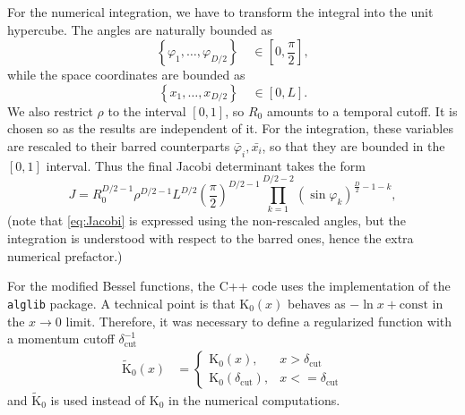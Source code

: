 \documentclass[twocolumn,secnumarabic,amssymb, nobibnotes, aps, prd]{revtex4-2}
\newcommand{\be}{\begin{equation}}
\newcommand{\ee}{\end{equation}}
\begin{document}
For the numerical integration, we have to transform the integral
into the unit hypercube. The angles are naturally bounded as
\be
\left\{ \varphi_{1},\dots,\varphi_{D/2}\right\}  \quad \in\left[0,\frac{\pi}{2}\right],
\ee
while the space coordinates are bounded as
\be
\left\{ x_{1},\dots,x_{D/2}\right\} \quad \in\left[0,L\right].
\ee
We also restrict $\rho$ to the interval $[0,1]$, so $R_0$ amounts to a temporal cutoff. It is chosen so as the results are independent of it.
For the integration, these variables are rescaled to their barred
counterparts $\bar{\varphi}_{i},\bar{x_i}$, so that they
are bounded in the $\left[0,1\right]$ interval. Thus the final Jacobi
determinant takes the form
\begin{equation}
J=R_0^{D/2-1}\rho^{D/2-1}L^{D/2}\left(\frac{\pi}{2}\right)^{D/2-1}\prod_{k=1}^{D/2-2}\left(\sin\varphi_{k}\right)^{\frac{D}{2}-1-k},\label{eq:Jacobi}
\end{equation}
(note that \eqref{eq:Jacobi} is expressed using the non-rescaled
angles, but the integration is understood with respect to the barred
ones, hence the extra numerical prefactor.)

For the modified Bessel functions, the C++ code uses the implementation
of the \texttt{alglib} package. A technical point is that $\mathrm{K}_{0}\left(x\right)$
behaves as $-\ln x+\mathrm{const}$ in the $x\rightarrow0$ limit.
Therefore, it was necessary to define a regularized function with a momentum cutoff $\delta_{\text{cut}}^{-1}$
\begin{align*}
\tilde{\mathrm{K}}_{0}\left(x\right) & =
\begin{cases}
\mathrm{K}_{0}\left(x\right), & x>\delta_{\text{cut}}\\
\mathrm{K}_{0}\left(\delta_{\text{cut}}\right), & x<=\delta_{\text{cut}}
\end{cases}
\end{align*}
and $\tilde{\mathrm{K}}_{0}$ is used instead of $\mathrm{K}_{0}$
in the numerical computations.


\end{document}

